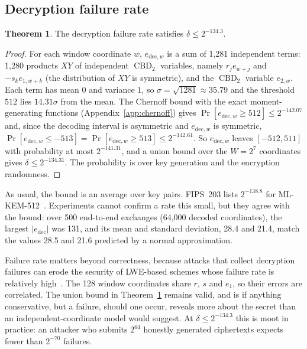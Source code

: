 \documentclass[11pt,a4paper]{article}
\theoremstyle{definition}
\newtheorem{theorem}{Theorem}
\newcommand{\CBD}{\operatorname{CBD}}
\begin{document}
\subsection{Decryption failure rate}\label{sec:dfr}
\begin{theorem}\label{thm:dfr}
The decryption failure rate satisfies $\delta \le 2^{-134.3}$.
\end{theorem}
\begin{proof}
For each window coordinate $w$, $e_{\mathrm{dec},w}$ is a sum of 1{,}281 independent terms: 1{,}280 products $XY$ of independent $\CBD_2$ variables, namely $r_j e_{w+j}$ and $-s_k e_{1,w+k}$ (the distribution of $XY$ is symmetric), and the $\CBD_2$ variable $e_{2,w}$. Each term has mean $0$ and variance $1$, so $\sigma = \sqrt{1281} \approx 35.79$ and the threshold $512$ lies $14.31\sigma$ from the mean. The Chernoff bound with the exact moment-generating functions (Appendix~\ref{app:chernoff}) gives $\Pr[e_{\mathrm{dec},w} \ge 512] \le 2^{-142.07}$ and, since the decoding interval is asymmetric and $e_{\mathrm{dec},w}$ is symmetric, $\Pr[e_{\mathrm{dec},w} \le -513] = \Pr[e_{\mathrm{dec},w} \ge 513] \le 2^{-142.61}$. So $e_{\mathrm{dec},w}$ leaves $[-512, 511]$ with probability at most $2^{-141.31}$, and a union bound over the $W = 2^7$ coordinates gives $\delta \le 2^{-134.31}$. The probability is over key generation and the encryption randomness.
\end{proof}

As usual, the bound is an average over key pairs. FIPS~203 lists $2^{-138.8}$ for ML-KEM-512~\cite[Table~1]{fips203}. Experiments cannot confirm a rate this small, but they agree with the bound: over 500 end-to-end exchanges (64{,}000 decoded coordinates), the largest $|e_{\mathrm{dec}}|$ was 131, and its mean and standard deviation, 28.4 and 21.4, match the values 28.5 and 21.6 predicted by a normal approximation.

Failure rate matters beyond correctness, because attacks that collect decryption failures can erode the security of LWE-based schemes whose failure rate is relatively high~\cite{danvers2019failures}. The 128 window coordinates share $r$, $s$ and $e_1$, so their errors are correlated. The union bound in Theorem~\ref{thm:dfr} remains valid, and is if anything conservative, but a failure, should one occur, reveals more about the secret than an independent-coordinate model would suggest. At $\delta \le 2^{-134.3}$ this is moot in practice: an attacker who submits $2^{64}$ honestly generated ciphertexts expects fewer than $2^{-70}$ failures.
\end{document}
